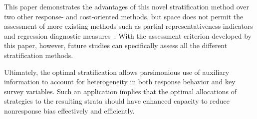 \documentclass[12pt]{article}
\begin{document}
This paper demonstrates the advantages of this novel stratification method over two other response- and cost-oriented methods, but space does not permit the assessment of more existing methods such as partial representativeness indicators and regression diagnostic measures\unskip~\cite{Schouten:2017:isr,Wagner:2014}.
With the assessment criterion developed by this paper, however, future studies can specifically assess all the different stratification methods.

Ultimately, the optimal stratification allows parsimonious use of auxiliary information to account for heterogeneity in both response behavior and key survey variables.
Such an application implies that the optimal allocations of strategies to the resulting strata should have enhanced capacity to reduce nonresponse bias effectively and efficiently.


\end{document}
